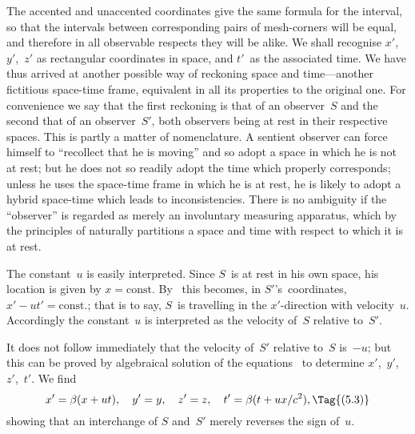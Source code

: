 \documentclass[12pt]{book}
\begin{document}
The accented and unaccented coordinates give the same formula for the
interval, so that the intervals between corresponding pairs of mesh-corners
will be equal, and therefore in all observable respects they will be alike. We
shall recognise $x'$,~$y'$,~$z'$ as rectangular coordinates in space, and $t'$~as the
associated time. We have thus arrived at another possible way of reckoning
space and time---another fictitious space-time frame, equivalent in all its
properties to the original one. For convenience we say that the first reckoning
is that of an observer~$S$ and the second that of an observer~$S'$, both observers
being at rest in their respective spaces\footnotemark.\footnotetext
  {This is partly a matter of nomenclature. A sentient observer can force himself to ``recollect
  that he is moving'' and so adopt a space in which he is not at rest; but he does not so readily
  adopt the time which properly corresponds; unless he uses the space-time frame in which he is
  at rest, he is likely to adopt a hybrid space-time which leads to inconsistencies. There is no
  ambiguity if the ``observer'' is regarded as merely an involuntary measuring apparatus, which by
  the principles of  naturally partitions a space and time with respect to which it is at rest.}

The constant~$u$ is easily interpreted. Since $S$~is at rest in his own space,
his location is given by $x = \text{const}$. By~ this becomes, in $S'$'s~coordinates,
$x' - ut' = \text{const.}$; that is to say, $S$~is travelling in the $x'$-direction with velocity~$u$.
Accordingly the constant~$u$ is interpreted as the velocity of~$S$ relative to~$S'$.

It does not follow immediately that the velocity of~$S'$ relative to~$S$ is~$-u$;
but this can be proved by algebraical solution of the equations~ to
determine $x'$,~$y'$, $z'$,~$t'$. We find
\[
x' = \beta(x + ut),\quad
y' = y,\quad
z' = z,\quad
t' = \beta(t + ux/c^{2}),
\Tag{(5.3)}
\]
showing that an interchange of $S$ and~$S'$ merely reverses the sign of~$u$.
\end{document}
